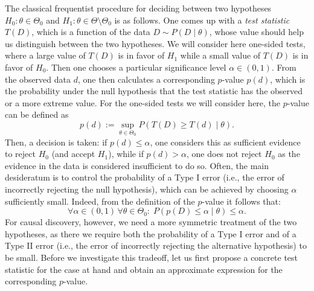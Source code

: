 The classical frequentist procedure for deciding between two hypotheses $H_0 : \theta \in \Theta_0$
and $H_1 : \theta \in \Theta\setminus\Theta_0$ is as follows.
One comes up with a \emph{test statistic} $T(D)$, which is a function of the data $D \sim P(D \mid \theta)$, 
whose value should help us distinguish between the two hypotheses. 
We will consider here one-sided tests, where a large value of $T(D)$ is in favor of $H_1$ while a small value of $T(D)$ is in favor of $H_0$. 
Then one chooses a particular significance level $\alpha \in (0,1)$. From
the observed data $d$, one then calculates a corresponding $p$-value $p(d)$, which is the probability under 
the null hypothesis that the test statistic has the observed or a more extreme value. For the
one-sided tests we will consider here, the $p$-value can be defined as
$$p(d) := \sup_{\theta\in\Theta_0} P(T(D) \ge T(d) \mid \theta).$$
Then, a decision is taken: if $p(d) \le \alpha$, one considers this as sufficient evidence to reject $H_0$ 
(and accept $H_1$), while if $p(d) > \alpha$, one does not reject $H_0$ as the evidence in the data 
is considered insufficient to do so.
Often, the main desideratum is to control the probability of a Type I error (i.e., the error of incorrectly
rejecting the null hypothesis), which can be achieved by choosing $\alpha$ sufficiently small.
Indeed, from the definition of the $p$-value it follows that:
  \[ \forall \alpha \in (0,1)\, \forall \theta \in \Theta_0:\;  P( p(D) \le \alpha \mid \theta) \le \alpha.\]
For causal discovery, however, we need a more symmetric treatment of the two hypotheses, 
as there we require both the probability of a Type I error and of a Type II error (i.e., the error of incorrectly 
rejecting the alternative hypothesis) to be small. Before we investigate this
tradeoff, let us first propose a concrete test statistic for the case at hand and 
obtain an approximate expression for the corresponding $p$-value.

